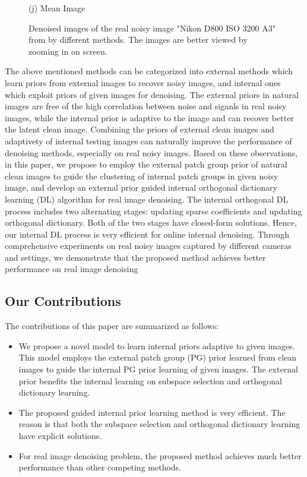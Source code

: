 \documentclass[10pt,twocolumn,letterpaper]{article}
\begin{document}
\begin{figure}
{\begin{minipage}[t]{0.195\textwidth}
{\footnotesize (j) Mean Image }
\end{minipage}
}\vspace{-1mm}
\caption{Denoised images of the real noisy image "Nikon D800 ISO 3200 A3" from \cite{crosschannel2016} by different methods. The images are better viewed by zooming in on screen.} \vspace{-4mm}
\end{figure}

The above mentioned methods can be categorized into external methods which learn priors from external images to recover noisy images, and internal ones which exploit priors of given images for denoising. The external priors in natural images are free of the high correlation between noise and siganls in real noisy images, while the internal prior is adaptive to the image and can recover better the latent clean image. Combining the priors of external clean images and adaptivety of internal testing images can naturally improve the performance of denoising methods, especially on real noisy images. Based on these observations, in this paper, we propose to employ the external patch group prior \cite{pgpd} of natural clean images to guide the clustering of internal patch groups in given noisy image, and develop an external prior guided internal orthogonal dictionary learning (DL) algorithm for real image denoising. The internal orthogonal DL process includes two alternating stages: updating sparse coefficients and updating orthogonal dictionary. Both of the two stages have closed-form solutions. Hence, our internal DL process is very efficient for online internal denoising. Through comprehensive experiments on real noisy images captured by different cameras and settings, we demonstrate that the proposed method achieves better performance on real image denoising

\subsection{Our Contributions}

The contributions of this paper are summarized as follows:
\begin{itemize}
\item We propose a novel model to learn internal priors adaptive to given images. This model employs the external patch group (PG) prior learned from clean images to guide the internal PG prior learning of given images. The external prior benefits the internal learning on subspace selection and orthogonal dictionary learning.
\item The proposed guided internal prior learning method is very efficient. The reason is that both the subspace selection and orthogonal dictionary learning have explicit solutions.
\item For real image denoising problem, the proposed method achieves much better performance than other competing methods.
\end{itemize}
\end{document}
